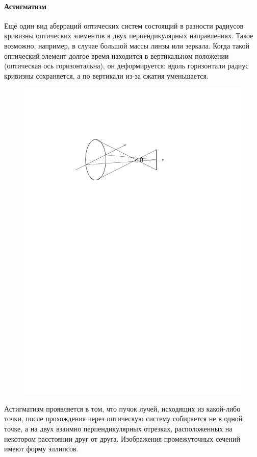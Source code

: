 
\paragraph{Астигматизм} Ещё один вид аберраций оптических систем состоящий в разности радиусов кривизны оптических элементов в двух перпендикулярных направлениях. Такое возможно, например, в случае большой массы линзы или зеркала. Когда такой оптический элемент долгое время находится в вертикальном положении (оптическая ось горизонтальна), он деформируется: вдоль горизонтали радиус кривизны сохраняется, а по вертикали из-за сжатия уменьшается.

\begin{figure}
    \centering
    \vspace{-1pc}
    \includegraphics[width=0.4\tw]{img/astigmatism.pdf}
    \caption{}
    \label{pic:astigmatism}
\end{figure}
Астигматизм проявляется в том, что пучок лучей, исходящих из какой-либо точки, после прохождения через оптическую систему собирается не в одной точке, а на двух взаимно перпендикулярных отрезках, расположенных на некотором расстоянии друг от друга. Изображения промежуточных сечений имеют форму эллипсов.

